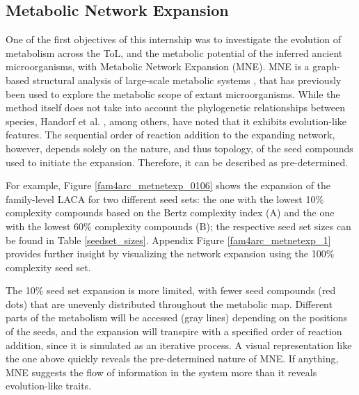 \subsection*{Metabolic Network Expansion}

One of the first objectives of this internship was to investigate the evolution of metabolism across the ToL, and the metabolic potential of the inferred ancient microorganisms, with Metabolic Network Expansion (MNE). MNE is a graph-based structural analysis of large-scale metabolic systems \cite{ebenhoh2004}, that has previously been used to explore the metabolic scope of extant microorganisms. While the method itself does not take into account the phylogenetic relationships between species, Handorf et al. \cite{handorf2005}, among others, have noted that it exhibits evolution-like features. The sequential order of reaction addition to the expanding network, however, depends solely on the nature, and thus topology, of the seed compounds used to initiate the expansion. Therefore, it can be described as pre-determined.

For example, Figure \ref{fam4arc_metnetexp_0106} shows the expansion of the family-level LACA for two different seed sets: the one with the lowest 10\% complexity compounds based on the Bertz complexity index (A) and the one with the lowest 60\% complexity compounds (B); the respective seed set sizes can be found in Table \ref{seedset_sizes}. Appendix Figure \ref{fam4arc_metnetexp_1} provides further insight by visualizing the network expansion using the 100\% complexity seed set.

The 10\% seed set expansion is more limited, with fewer seed compounds (red dots) that are unevenly distributed throughout the metabolic map. Different parts of the metabolism will be accessed (gray lines) depending on the positions of the seeds, and the expansion will transpire with a specified order of reaction addition, since it is simulated as an iterative process. A visual representation like the one above quickly reveals the pre-determined nature of MNE. If anything, MNE suggests the flow of information in the system more than it reveals evolution-like traits.

